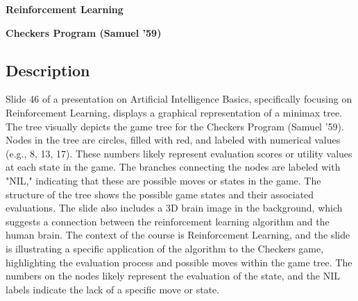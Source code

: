 \documentclass{article}%
\begin{document}
\textbf{Reinforcement Learning}

\textbf{Checkers Program (Samuel '59)}

%
\subsection{Description}%
Slide 46 of a presentation on Artificial Intelligence Basics, specifically focusing on Reinforcement Learning, displays a graphical representation of a minimax tree.  The tree visually depicts the game tree for the Checkers Program (Samuel '59).  Nodes in the tree are circles, filled with red, and labeled with numerical values (e.g., 8, 13, 17).  These numbers likely represent evaluation scores or utility values at each state in the game.  The branches connecting the nodes are labeled with "NIL," indicating that these are possible moves or states in the game.  The structure of the tree shows the possible game states and their associated evaluations.  The slide also includes a 3D brain image in the background, which suggests a connection between the reinforcement learning algorithm and the human brain.  The context of the course is Reinforcement Learning, and the slide is illustrating a specific application of the algorithm to the Checkers game, highlighting the evaluation process and possible moves within the game tree.  The numbers on the nodes likely represent the evaluation of the state, and the NIL labels indicate the lack of a specific move or state.%
\end{document}
